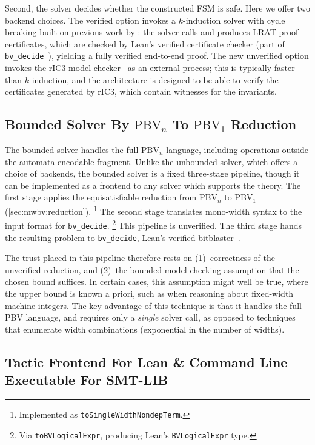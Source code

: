 Second, the solver decides whether the constructed FSM is safe.
Here we offer two backend choices.
The verified option invokes a $k$-induction solver with cycle breaking built on
previous work by \citet{bhat2025certified}:
the solver calls \cadical{} and produces LRAT proof certificates,
which are checked by Lean's verified certificate checker
(part of \texttt{bv\_decide}~\cite{leanbv}),
yielding a fully verified end-to-end proof.
The new unverified option invokes the rIC3 model checker~\cite{ric3} as an
external process; this is typically faster than $k$-induction, and the
architecture is designed to be able to verify the certificates generated by
rIC3, which contain witnesses for the invariants.

\subsection{Bounded Solver By $\text{PBV}_n$ To $\text{PBV}_1$ Reduction}

The bounded solver handles the full $\text{PBV}_n$ language, including
operations outside the automata-encodable fragment. Unlike the unbounded solver,
which offers a choice of backends, the bounded solver is a fixed three-stage
pipeline, though it can be implemented as a frontend to any solver which
supports the \qfbv{} theory.
%
The first stage applies the equisatisfiable reduction
from $\text{PBV}_n$ to $\text{PBV}_1$ (\cref{sec:mwbv:reduction}).%
\footnote{Implemented as \texttt{toSingleWidthNondepTerm}.}
The second stage translates mono-width syntax to the input format
for \texttt{bv\_decide}.%
\footnote{Via \texttt{toBVLogicalExpr}, producing Lean's \texttt{BVLogicalExpr} type.}
This pipeline is unverified.
The third stage hands the resulting \qfbv{} problem to \texttt{bv\_decide},
Lean's verified bitblaster~\cite{leanbv}.

The trust placed in this pipeline therefore rests on
(1)~correctness of the unverified reduction, and
(2)~the bounded model checking assumption that the chosen bound suffices.
  In certain cases, this assumption might well be true, where the upper bound is known a priori,
  such as when reasoning about fixed-width machine integers.
The key advantage of this technique is that it handles the full PBV language,
and requires only a \emph{single} solver call,
as opposed to techniques that enumerate width combinations
(exponential in the number of widths).

\subsection{Tactic Frontend For Lean \& Command Line Executable For SMT-LIB}

